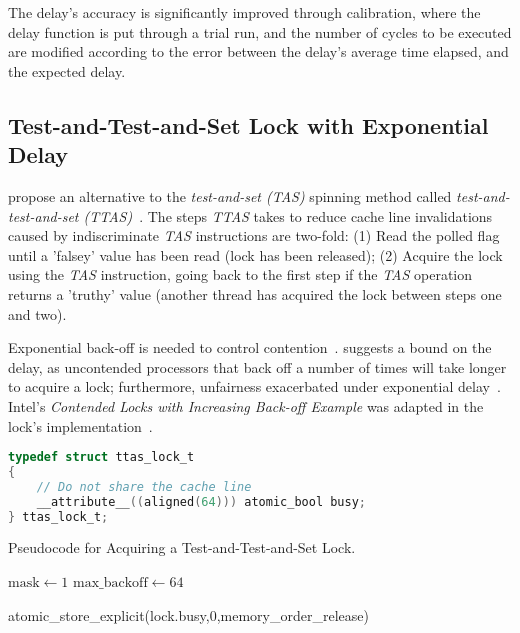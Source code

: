 The delay's accuracy is significantly improved through calibration, where the
delay function is put through a trial run, and the number of cycles to be
executed are modified according to the error between the delay's average time
elapsed, and the expected delay.

\subsection{Test-and-Test-and-Set Lock with Exponential Delay}
\citeauthor{rudolph1984dynamic} propose an alternative to the \emph{test-and-set
(TAS)} spinning method called \emph{test-and-test-and-set
(TTAS)}~\citep{rudolph1984dynamic}. The steps \emph{TTAS} takes to reduce cache line
invalidations caused by indiscriminate \emph{TAS} instructions are two-fold: (1) Read
the polled flag until a 'falsey' value has been read (lock has been released);
(2) Acquire the lock using the \emph{TAS} instruction, going back to the
first step if the \emph{TAS} operation returns a 'truthy' value (another thread
has acquired the lock between steps one and two). 

Exponential back-off is needed to control
contention~\citep{valois1994queues}. \citeauthor{anderson1990performance}
suggests a bound on the delay, as uncontended processors that back off a number
of times will take longer to acquire a lock; furthermore, unfairness
exacerbated under exponential delay~\citep[Section~7.4]{herlihy2020art}.
Intel's \emph{Contended Locks with Increasing
Back-off Example} was adapted in the lock's implementation~\citep{intelmanualoptimization}.

\begin{lstlisting}[language=C,caption={Test-and-Test-and-Set Lock Struct.}]
typedef struct ttas_lock_t
{
    // Do not share the cache line
    __attribute__((aligned(64))) atomic_bool busy;
} ttas_lock_t;

\end{lstlisting}

\begin{algorithm}
    \caption{Pseudocode for Acquiring a Test-and-Test-and-Set
    Lock.}\label{alg:ttas_acquire}
        $\text{mask} \gets 1$
        $\text{max\_backoff} \gets 64$
            {
            
        }
        atomic\_store\_explicit(lock.busy,0,memory\_order\_release)
\end{algorithm}


